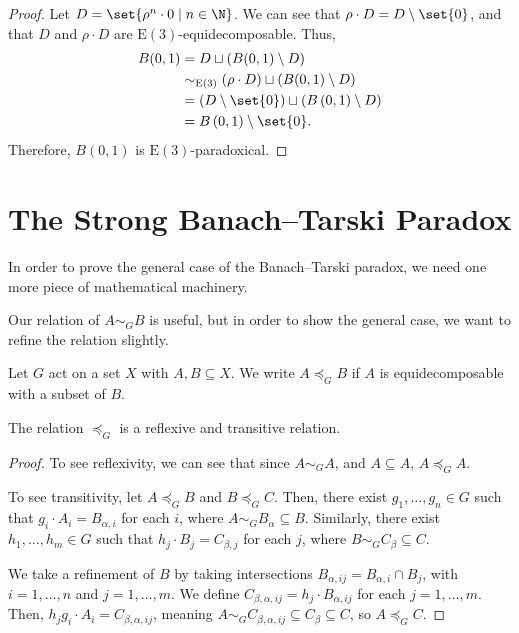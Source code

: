 \begin{proof}
  Let $D = \set{\rho^{n}\cdot 0\mid n\in \N}$. We can see that $\rho\cdot D = D\setminus \set{0}$, and that $D$ and $\rho\cdot D$ are $\text{E}(3)$-equidecomposable. Thus,
  \begin{align*}
    B(0,1) &= D\sqcup \left(B(0,1)\setminus D\right)\\
           &\sim_{\text{E}(3)}\left(\rho\cdot D\right) \sqcup \left(B(0,1)\setminus D\right)\\
           &= \left(D\setminus \set{0}\right)\sqcup \left(B\left(0,1\right)\setminus D\right)\\
           &= B\left(0,1\right)\setminus \set{0}.
  \end{align*}
  Therefore, $B(0,1)$ is $\text{E}(3)$-paradoxical.
\end{proof}
\section{The Strong Banach--Tarski Paradox}\label{sec:full_banach_tarski}%
In order to prove the general case of the Banach--Tarski paradox, we need one more piece of mathematical machinery.\newline

Our relation of $A \sim_{G} B$ is useful, but in order to show the general case, we want to refine the relation slightly.
\begin{definition}
  Let $G$ act on a set $X$ with $A,B\subseteq X$. We write $A\preceq_{G}B$ if $A$ is equidecomposable with a subset of $B$.
\end{definition}
\begin{fact}
  The relation $\preceq_{G}$ is a reflexive and transitive relation.\label{fact:preorder}
\end{fact}
\begin{proof}
  To see reflexivity, we can see that since $A\sim_{G}A$, and $A\subseteq A$, $A\preceq_{G} A$.\newline

  To see transitivity, let $A\preceq_{G}B$ and $B\preceq_{G}C$. Then, there exist $g_1,\dots,g_n\in G$ such that $g_i\cdot A_i = B_{\alpha,i}$ for each $i$, where $A\sim_{G}B_{\alpha}\subseteq B$. Similarly, there exist $h_1,\dots,h_m\in G$ such that $h_j\cdot B_j= C_{\beta,j}$ for each $j$, where $B\sim_{G}C_{\beta}\subseteq C$.\newline

  We take a refinement of $B$ by taking intersections $B_{\alpha,ij} = B_{\alpha,i}\cap B_j$, with $i=1,\dots,n$ and $j = 1,\dots,m$. We define $C_{\beta,\alpha,ij} = h_j\cdot B_{\alpha,ij}$ for each $j = 1,\dots,m$. Then, $h_jg_i\cdot A_i = C_{\beta,\alpha,ij}$, meaning $A\sim_{G}C_{\beta,\alpha,ij}\subseteq C_{\beta}\subseteq C$, so $A\preceq_{G}C$.
\end{proof}

